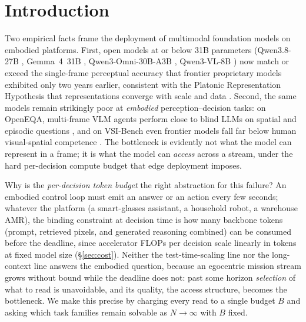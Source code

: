\documentclass[10pt]{article}
\theoremstyle{definition}
\theoremstyle{plain}
\begin{document}
\section{Introduction}
\label{sec:intro}

Two empirical facts frame the deployment of multimodal foundation models on embodied platforms. First, open models at or below 31B parameters (Qwen3.8-27B \citep{qwen38}, Gemma~4~31B \citep{gemma4}, Qwen3-Omni-30B-A3B \citep{qwen3omni}, Qwen3-VL-8B \citep{qwen3vl}) now match or exceed the single-frame perceptual accuracy that frontier proprietary models exhibited only two years earlier, consistent with the Platonic Representation Hypothesis that representations converge with scale and data \citep{prh}. Second, the same models remain strikingly poor at \emph{embodied} perception--decision tasks: on OpenEQA, multi-frame VLM agents perform close to blind LLMs on spatial and episodic questions \citep{openeqa}, and on VSI-Bench even frontier models fall far below human visual-spatial competence \citep{vsibench}. The bottleneck is evidently not what the model can represent in a frame; it is what the model can \emph{access} across a stream, under the hard per-decision compute budget that edge deployment imposes.

Why is the \emph{per-decision token budget} the right abstraction for this failure? An embodied control loop must emit an answer or an action every few seconds; whatever the platform (a smart-glasses assistant, a household robot, a warehouse AMR), the binding constraint at decision time is how many backbone tokens (prompt, retrieved pixels, and generated reasoning combined) can be consumed before the deadline, since accelerator FLOPs per decision scale linearly in tokens at fixed model size (\S\ref{sec:cost}). Neither the test-time-scaling line \citep{snell,s1,feng-cot} nor the long-context line \citep{ringattention,lwm,longva} answers the embodied question, because an egocentric mission stream grows without bound while the deadline does not: past some horizon \emph{selection} of what to read is unavoidable, and its quality, the access structure, becomes the bottleneck. We make this precise by charging every read to a single budget $B$ and asking which task families remain solvable as $N\to\infty$ with $B$ fixed.
\end{document}
